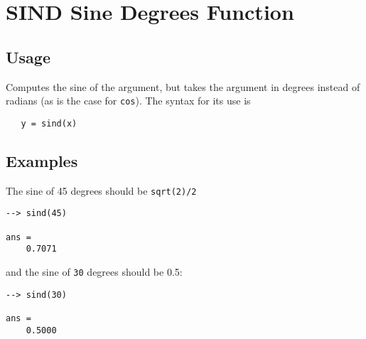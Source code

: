 \section{SIND Sine Degrees Function}

\subsection{Usage}

Computes the sine of the argument, but takes
the argument in degrees instead of radians (as is the case
for \verb|cos|). The syntax for its use is
\begin{verbatim}
   y = sind(x)
\end{verbatim}
\subsection{Examples}

The sine of 45 degrees should be \verb|sqrt(2)/2|
\begin{verbatim}
--> sind(45)

ans = 
    0.7071 
\end{verbatim}
and the sine of \verb|30| degrees should be 0.5:
\begin{verbatim}
--> sind(30)

ans = 
    0.5000 
\end{verbatim}
